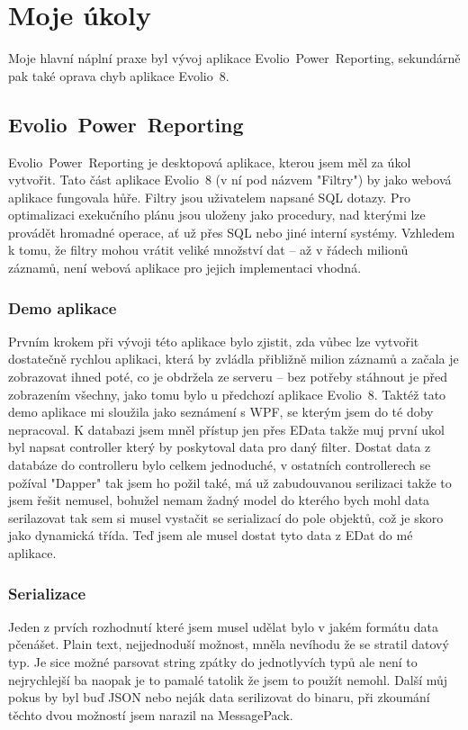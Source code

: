 \documentclass[czech,bachelor,dept460,male,csharp]{diploma}
\newcommand{\EvolioEight}{Evolio~8}
\newcommand{\EFilters}{Evolio~Power~Reporting}
\newcommand{\EData}{EData}
\begin{document}
\section{Moje úkoly}
	Moje hlavní náplní praxe byl vývoj aplikace {\EFilters}, sekundárně pak také oprava chyb aplikace {\EvolioEight}.
	\subsection{\EFilters}
		{\EFilters} je desktopová aplikace, kterou jsem měl za úkol vytvořit. Tato část aplikace {\EvolioEight} (v ní pod názvem "Filtry") by jako webová aplikace fungovala hůře.
		Filtry jsou uživatelem napsané SQL dotazy. Pro optimalizaci exekučního plánu jsou uloženy jako procedury, nad kterými lze provádět hromadné operace, ať už přes SQL nebo jiné interní systémy.
		Vzhledem k tomu, že filtry mohou vrátit veliké množství dat – až v řádech milionů záznamů, není webová aplikace pro jejich implementaci vhodná.
		\subsubsection{Demo aplikace}
			Prvním krokem při vývoji této aplikace bylo zjistit, zda vůbec lze vytvořit dostatečně rychlou aplikaci, která by zvládla přibližně milion záznamů a začala je zobrazovat ihned poté, co je obdržela ze serveru – bez potřeby stáhnout je před zobrazením všechny, jako tomu bylo u předchozí aplikace {\EvolioEight}.
			Taktéž tato demo aplikace mi sloužila jako seznámení s WPF, se kterým jsem do té doby nepracoval.
			K databazi jsem mněl přístup jen přes {\EData} takže muj první ukol byl napsat controller který by poskytoval data pro daný filter. Dostat data z databáze do controlleru bylo celkem jednoduché, v ostatních controllerech se požíval "Dapper" tak jsem ho požil také, má už zabudouvanou serilizaci takže to jsem řešit nemusel, bohužel nemam žadný model do kterého bych mohl data serilazovat tak sem si musel vystačit se serializací do pole objektů, což je skoro jako dynamická třída. Teď jsem ale musel dostat tyto data z EDat do mé aplikace.
		\subsubsection{Serializace}
			Jeden z prvích rozhodnutí které jsem musel udělat bylo v jakém formátu data pčenášet. Plain text, nejjednoduší možnost, mněla nevíhodu že se stratil datový typ. Je sice možné parsovat string zpátky do jednotlyvích typů ale není to nejrychlejší ba naopak je to pamalé tatolik že jsem to použít nemohl.
			Další můj pokus by byl buď JSON nebo neják data serilizovat do binaru, při zkoumání těchto dvou možností jsem narazil na MessagePack. 
\end{document}
